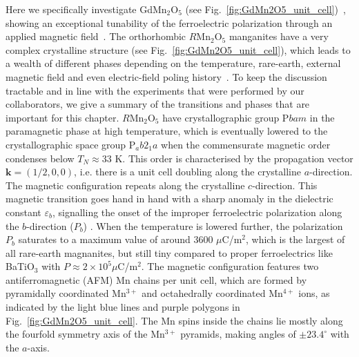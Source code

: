Here we specifically investigate GdMn$_2$O$_5$ (see Fig.~\ref{fig:GdMn2O5_unit_cell})~\cite{Khomskii2009}, showing an exceptional tunability of the ferroelectric polarization through an applied magnetic field~\cite{Lee13}.
The orthorhombic $R$Mn$_2$O$_5$ manganites have a very complex crystalline structure (see Fig.~\ref{fig:GdMn2O5_unit_cell}), which leads to a wealth of different phases depending on the temperature, rare-earth, external magnetic field and even electric-field poling history~\cite{Zheng2019}.
To keep the discussion tractable and in line with the experiments that were performed by our collaborators, we give a summary of the transitions and phases that are important for this chapter.
$R$Mn$_2$O$_5$ have crystallographic group P$bam$ \cite{Alonso97} in the paramagnetic phase at high temperature, which is eventually lowered to the crystallographic space group P$_ab2_1a$ when the commensurate magnetic order condenses below $T_{N} \approx 33$ K.
This order is characterised by the propagation vector $\bm{k} = (1/2, 0, 0)$, i.e. there is a unit cell doubling along the crystalline $a$-direction.
The magnetic configuration repeats along the crystalline $c$-direction. This magnetic transition goes hand in hand with a sharp anomaly in the dielectric constant $\varepsilon_b$, signalling the onset of the improper ferroelectric polarization  along the $b$-direction ($P_b$) \cite{Lee13}.
When the temperature is lowered further, the polarization $P_b$ saturates to a maximum value of around 3600 $\mu$C/m$^2$, which is the largest of all rare-earth magnanites, but still tiny compared to proper ferroelectrics like BaTiO$_3$ with $P \approx 2 \times 10^5 \mu $C/m$^2$.
The magnetic configuration features two antiferromagnetic (AFM) Mn chains per unit cell, which are formed by pyramidally coordinated Mn$^{3+}$ and octahedrally coordinated Mn$^{4+}$ ions, as indicated by the light blue lines and purple polygons in Fig.~\ref{fig:GdMn2O5_unit_cell}. The Mn spins inside the chains lie mostly along the fourfold symmetry axis of the Mn$^{3+}$ pyramids, making angles of $\pm 23.4^\circ$ with the $a$-axis.

